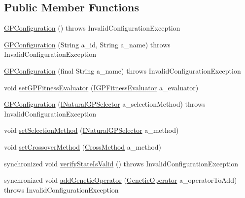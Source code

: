 \subsection*{Public Member Functions}
\begin{DoxyCompactItemize}
\item 
\hyperlink{classorg_1_1jgap_1_1gp_1_1impl_1_1_g_p_configuration_adae3b53fca5a8710f3fda49ce5ea0d69}{G\-P\-Configuration} ()  throws Invalid\-Configuration\-Exception 
\item 
\hyperlink{classorg_1_1jgap_1_1gp_1_1impl_1_1_g_p_configuration_ac1667980e0daa67dbf4960982caf66c8}{G\-P\-Configuration} (String a\-\_\-id, String a\-\_\-name)  throws Invalid\-Configuration\-Exception 
\item 
\hyperlink{classorg_1_1jgap_1_1gp_1_1impl_1_1_g_p_configuration_a06752dc4dd7f399d0ffb39f7bf74aa3c}{G\-P\-Configuration} (final String a\-\_\-name)  throws Invalid\-Configuration\-Exception 
\item 
void \hyperlink{classorg_1_1jgap_1_1gp_1_1impl_1_1_g_p_configuration_ad4b5b75723a3c68ecb5894062a859945}{set\-G\-P\-Fitness\-Evaluator} (\hyperlink{interfaceorg_1_1jgap_1_1gp_1_1_i_g_p_fitness_evaluator}{I\-G\-P\-Fitness\-Evaluator} a\-\_\-evaluator)
\item 
\hyperlink{classorg_1_1jgap_1_1gp_1_1impl_1_1_g_p_configuration_a601f846c992d1006ed16a98042dec7e6}{G\-P\-Configuration} (\hyperlink{interfaceorg_1_1jgap_1_1gp_1_1_i_natural_g_p_selector}{I\-Natural\-G\-P\-Selector} a\-\_\-selection\-Method)  throws Invalid\-Configuration\-Exception 
\item 
void \hyperlink{classorg_1_1jgap_1_1gp_1_1impl_1_1_g_p_configuration_a4d28e1e726213d16a24dc9def4bd5818}{set\-Selection\-Method} (\hyperlink{interfaceorg_1_1jgap_1_1gp_1_1_i_natural_g_p_selector}{I\-Natural\-G\-P\-Selector} a\-\_\-method)
\item 
void \hyperlink{classorg_1_1jgap_1_1gp_1_1impl_1_1_g_p_configuration_af60a1eafd8e48a25863637c557ebca78}{set\-Crossover\-Method} (\hyperlink{classorg_1_1jgap_1_1gp_1_1_cross_method}{Cross\-Method} a\-\_\-method)
\item 
synchronized void \hyperlink{classorg_1_1jgap_1_1gp_1_1impl_1_1_g_p_configuration_aecc9793a97a876bcace87e8356a259b0}{verify\-State\-Is\-Valid} ()  throws Invalid\-Configuration\-Exception 
\item 
synchronized void \hyperlink{classorg_1_1jgap_1_1gp_1_1impl_1_1_g_p_configuration_a45e15f2fc648ecc1403da1ab68d95e63}{add\-Genetic\-Operator} (\hyperlink{interfaceorg_1_1jgap_1_1_genetic_operator}{Genetic\-Operator} a\-\_\-operator\-To\-Add)  throws Invalid\-Configuration\-Exception 

\end{DoxyCompactItemize}
